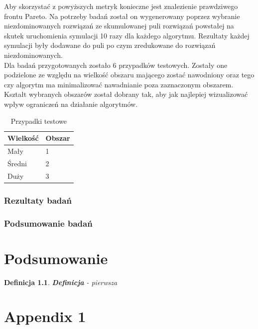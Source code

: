 \documentclass[twoside]{iisthesis}
\newtheorem{mydef}{Definicja}
\begin{document}
Aby skorzystać z powyższych metryk konieczne jest znalezienie prawdziwego frontu Pareto. Na potrzeby badań został on wygenerowany   poprzez wybranie niezdominowanych rozwiązań ze skumulowanej puli rozwiązań powstałej na skutek uruchomienia symulacji 10 razy dla każdego algorytmu. Rezultaty każdej symulacji były dodawane do puli po czym zredukowane do rozwiązań niezdominowanych.\\
Dla badań przygotowanych zostało 6 przypadków testowych. Zostały one podzielone ze względu na wielkość obszaru mającego zostać nawodniony oraz tego czy algorytm ma minimalizować nawadnianie poza zaznaczonym obszarem. Kształt wybranych obszarów został dobrany tak, aby jak najlepiej wizualizować wpływ ograniczeń na działanie algorytmów.

\begin{table}[]
\centering
\caption{Przypadki testowe}
\label{my-label}
\begin{tabular}{|l|l|}
\hline
Wielkość & Obszar \\ \hline
Mały & 1 \\ \hline
Średni & 2 \\ \hline
Duży & 3 \\ \hline
\end{tabular}
\end{table}

\subsection{Rezultaty badań}
\subsection{Podsumowanie badań}

\chapter{Podsumowanie}

\begin{mydef}
\textbf{Definicja} - pierwsza
\end{mydef}




 \clearpage
\appendix
\chapter{Appendix 1}


\clearpage
\pagestyle{plain}
\listofmyfigure
\listofmyequations
\listofmyalgorithm
\clearpage




\end{document}
